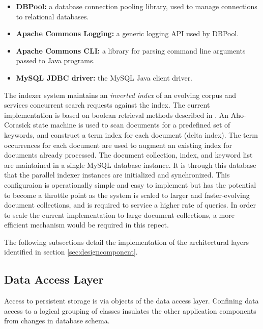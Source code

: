 \documentclass[10pt]{report}
\begin{document}
\begin{itemize}
  \item \textbf{DBPool:} a database connection pooling library, used
    to manage connections to relational databases.
  \item \textbf{Apache Commons Logging:} a generic logging API used by
    DBPool.
  \item \textbf{Apache Commons CLI:} a library for parsing command
    line arguments passed to Java programs.
  \item \textbf{MySQL JDBC driver:} the MySQL Java client driver.
\end{itemize}


The indexer system maintains an \textit{inverted index} of an evolving
corpus and services concurrent search requests against the index. The
current implementation is based on boolean retrieval methods described
in \cite{RefWorks:109}. An Aho-Corasick state machine
\cite{RefWorks:103} is used to scan documents for a predefined set of
keywords, and construct a term index for each document (delta
index). The term occurrences for each document are used to augment an
existing index for documents already processed. The document
collection, index, and keyword list are maintained in a single MySQL
database instance. It is through this database that the parallel
indexer instances are initialized and synchronized. This configuraion
is operationally simple and easy to implement but has the potential to
become a throttle point as the system is scaled to larger and
faster-evolving document collections, and is required to service a
higher rate of queries. In order to scale the current implementation
to large document collections, a more efficient mechanism would be
required in this repect.

The following subsections detail the implementation of the
architectural layers identified in section \ref{sec:designcomponent}.


\subsection{Data Access Layer}
\label{sec:dataaccesslayer}
Access to persistent storage is via objects of the data access
layer. Confining data access to a logical grouping of classes
insulates the other application components from changes in database
schema.
\end{document}
